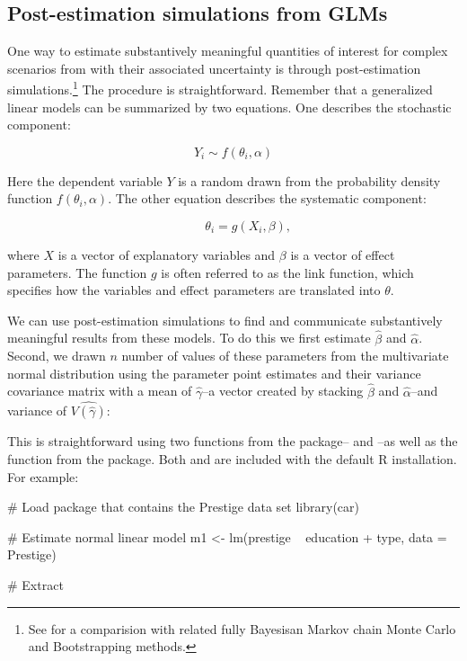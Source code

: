 \subsection{Post-estimation simulations from
GLMs}\label{post-estimation-simulations-from-glms}

One way to estimate substantively meaningful quantities of interest for
complex scenarios from with their associated uncertainty is through
post-estimation
simulations.\footnote{See \citet{King2000} for a comparision with related fully Bayesisan Markov chain Monte Carlo and Bootstrapping methods.}
The procedure is straightforward. Remember that a generalized linear
models can be summarized by two equations. One describes the stochastic
component:

\begin{equation}
Y_{i} \sim f(\theta_{i}, \alpha)
\end{equation}

\noindent Here the dependent variable \(Y\) is a random drawn from the
probability density function \(f(\theta_{i}, \alpha)\). The other
equation describes the systematic component:

\begin{equation}
\hspace{1cm} \theta_{i} = g(X_{i}, \beta),
\end{equation}

where \(X\) is a vector of explanatory variables and \(\beta\) is a
vector of effect parameters. The function \(g\) is often referred to as
the link function, which specifies how the variables and effect
parameters are translated into \(\theta\).

We can use post-estimation simulations to find and communicate
substantively meaningful results from these models. To do this we first
estimate \(\hat{\beta}\) and \(\hat{\alpha}\). Second, we drawn \(n\)
number of values of these parameters from the multivariate normal
distribution using the parameter point estimates and their variance
covariance matrix with a mean of \(\hat{\gamma}\)--a vector created by
stacking \(\hat{\beta}\) and \(\hat{\alpha}\)--and variance of
\(\hat{V(\hat{\gamma})}\):

This is straightforward using two functions from the 
package-- and --as well as the 
function from the  package. Both  and
 are included with the default R installation. For
example:

\begin{Schunk}
\begin{Sinput}
# Load package that contains the Prestige data set
library(car)

# Estimate normal linear model
m1 <- lm(prestige ~ education + type, data = Prestige)

# Extract 
\end{Sinput}
\end{Schunk}

